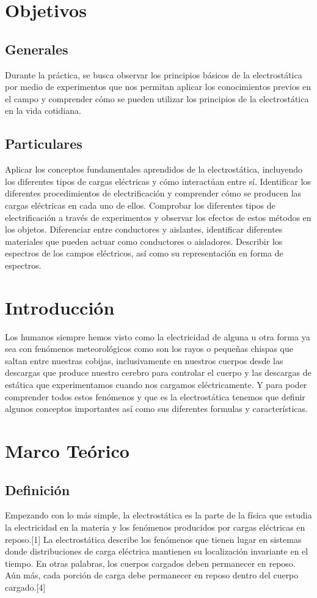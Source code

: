 \documentclass[spanish,10pt,a4paper,onecolumn]{article}
\begin{document}
\section{Objetivos} 

\subsection{Generales}
Durante la práctica, se busca observar los principios básicos de la electrostática por medio de experimentos que nos permitan aplicar los conocimientos previos en el campo y comprender cómo se pueden utilizar los principios de la electrostática en la vida cotidiana.

\subsection{Particulares}
Aplicar los conceptos fundamentales aprendidos de la electrostática, incluyendo los diferentes tipos de cargas eléctricas y cómo interactúan entre sí.
Identificar los diferentes procedimientos de electrificación y comprender cómo se producen las cargas eléctricas en cada uno de ellos.
Comprobar los diferentes tipos de electrificación a través de experimentos y observar los efectos de estos métodos en los objetos.
Diferenciar entre conductores y aislantes, identificar diferentes materiales que pueden actuar como conductores o aisladores.
Describir los espectros de los campos eléctricos, así como su representación en forma de espectros.

\section{Introducción}
Los humanos siempre hemos visto como la electricidad de alguna u otra forma ya sea con fenómenos meteorológicos como son los rayos o pequeñas chispas que saltan entre nuestras cobijas, inclusivamente en nuestros cuerpos desde las descargas que produce nuestro cerebro para controlar el cuerpo y las descargas de estática que experimentamos cuando nos cargamos eléctricamente. Y para poder comprender todos estos fenómenos y que es la electrostática tenemos que definir algunos conceptos importantes así como sus diferentes formulas y características. 

\newpage
	\section {Marco Teórico}

\subsection{Definición}
Empezando con lo más simple, la electrostática es la parte de la física que estudia la electricidad en la materia y los
fenómenos producidos por cargas eléctricas en reposo.[1]
La electrostática describe los fenómenos que tienen lugar en sistemas donde distribuciones de carga eléctrica mantienen su localización invariante en el tiempo. En
otras palabras, los cuerpos cargados deben permanecer en reposo. Aún más, cada porción de carga debe permanecer en reposo dentro del cuerpo cargado.[4]
\end{document}
